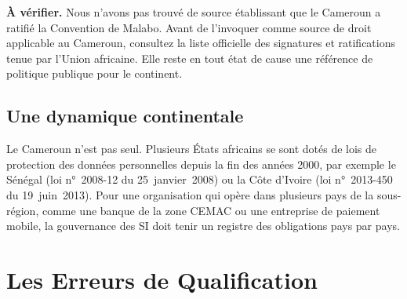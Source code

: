 \begin{boxalert}
\textbf{À vérifier.} Nous n'avons pas trouvé de source établissant que le
Cameroun a ratifié la Convention de Malabo. Avant de l'invoquer comme
source de droit applicable au Cameroun, consultez la liste officielle des
signatures et ratifications tenue par l'Union africaine. Elle reste en
tout état de cause une référence de politique publique pour le
continent.
\end{boxalert}

\subsection{Une dynamique continentale}

Le Cameroun n'est pas seul. Plusieurs États africains se sont dotés de
lois de protection des données personnelles depuis la fin des années
2000, par exemple le Sénégal (loi n°~2008-12 du 25~janvier~2008) ou la
Côte d'Ivoire (loi n°~2013-450 du 19~juin~2013). Pour une organisation qui
opère dans plusieurs pays de la sous-région, comme une banque de la zone
CEMAC ou une entreprise de paiement mobile, la gouvernance des SI doit
tenir un registre des obligations pays par pays.

\section{Les Erreurs de Qualification}
\label{sec:c10-erreurs}

